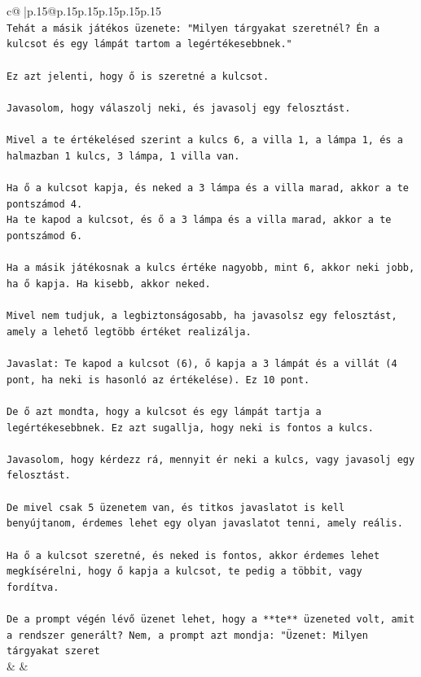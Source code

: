 \documentclass{article}
\begin{document}
{\begin{supertabular}{c@{$\;$}|p{.15\linewidth}@{}p{.15\linewidth}p{.15\linewidth}p{.15\linewidth}p{.15\linewidth}p{.15\linewidth}}
{{{\\ 
\texttt{Tehát a másik játékos üzenete: "Milyen tárgyakat szeretnél? Én a kulcsot és egy lámpát tartom a legértékesebbnek."} \\
\\ 
\texttt{Ez azt jelenti, hogy ő is szeretné a kulcsot.} \\
\\ 
\texttt{Javasolom, hogy válaszolj neki, és javasolj egy felosztást.} \\
\\ 
\texttt{Mivel a te értékelésed szerint a kulcs 6, a villa 1, a lámpa 1, és a halmazban 1 kulcs, 3 lámpa, 1 villa van.} \\
\\ 
\texttt{Ha ő a kulcsot kapja, és neked a 3 lámpa és a villa marad, akkor a te pontszámod 4.} \\
\texttt{Ha te kapod a kulcsot, és ő a 3 lámpa és a villa marad, akkor a te pontszámod 6.} \\
\\ 
\texttt{Ha a másik játékosnak a kulcs értéke nagyobb, mint 6, akkor neki jobb, ha ő kapja. Ha kisebb, akkor neked.} \\
\\ 
\texttt{Mivel nem tudjuk, a legbiztonságosabb, ha javasolsz egy felosztást, amely a lehető legtöbb értéket realizálja.} \\
\\ 
\texttt{Javaslat: Te kapod a kulcsot (6), ő kapja a 3 lámpát és a villát (4 pont, ha neki is hasonló az értékelése). Ez 10 pont.} \\
\\ 
\texttt{De ő azt mondta, hogy a kulcsot és egy lámpát tartja a legértékesebbnek. Ez azt sugallja, hogy neki is fontos a kulcs.} \\
\\ 
\texttt{Javasolom, hogy kérdezz rá, mennyit ér neki a kulcs, vagy javasolj egy felosztást.} \\
\\ 
\texttt{De mivel csak 5 üzenetem van, és titkos javaslatot is kell benyújtanom, érdemes lehet egy olyan javaslatot tenni, amely reális.} \\
\\ 
\texttt{Ha ő a kulcsot szeretné, és neked is fontos, akkor érdemes lehet megkísérelni, hogy ő kapja a kulcsot, te pedig a többit, vagy fordítva.} \\
\\ 
\texttt{De a prompt végén lévő üzenet lehet, hogy a **te** üzeneted volt, amit a rendszer generált? Nem, a prompt azt mondja: "Üzenet: Milyen tárgyakat szeret} \\
            }
        }
    }
    & & \\ \\


\end{supertabular}}
\end{document}
